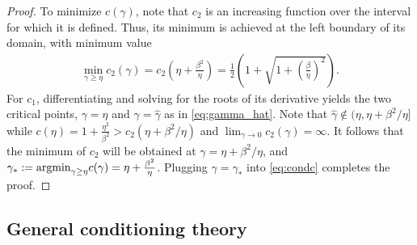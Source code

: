 \documentclass[review]{siamart}
\begin{document}
\begin{proof}
To minimize $c(\gamma)$, note that $c_2$ is an increasing function over the interval
for which it is defined. Thus, its minimum is achieved at the left boundary
of its domain, with minimum value
%
\begin{align} 
\label{eq:c2_min}
\min_{\gamma\geq\eta} c_2(\gamma) = 
	c_2\left(\eta + \frac{\beta^2}{\eta} \right) =
\frac{1}{2} \left( 1 + \sqrt{1 + \left( \frac{\beta}{\eta} \right)^2} \right).
\end{align}
%
For $c_1$, differentiating and solving for the roots of its derivative
yields the two critical points, $\gamma = \eta$ and $\gamma = \hat{\gamma}$
as in \eqref{eq:gamma_hat}. Note that $\hat{\gamma}\not\in(\eta, \eta + \beta^2/\eta]$
while $c(\eta) = 1+\tfrac{\eta^2}{\beta^2} > c_2(\eta + \beta^2/\eta)$
and $\lim_{\gamma\to 0} c_2(\gamma) = \infty$. It follows that the minimum of $c_2$
will be obtained at $\gamma = \eta + \beta^2/\eta$, and
$\gamma_* := \textnormal{argmin}_{\gamma\geq\eta} c(\gamma) = 
\eta + \tfrac{\beta^2}{\eta}$. Plugging $\gamma = \gamma_*$ into
\eqref{eq:condc} completes the proof.

\end{proof}

\subsection{General conditioning theory}\label{sec:theory:gen}
\end{document}
